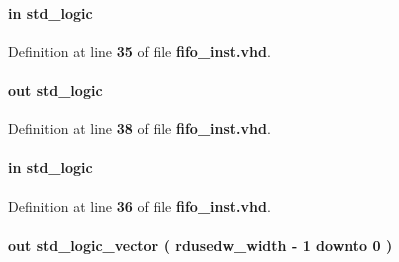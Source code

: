 \paragraph[{rdclk}]{ {\bfseries \textcolor{keywordflow}{in}\textcolor{vhdlchar}{ }} {\bfseries \textcolor{comment}{std\+\_\+logic}\textcolor{vhdlchar}{ }} \hspace{0.3cm}{\ttfamily [Port]}}\label{classfifo__inst_a75a474974665eb4350aea5fa937cb26a}


Definition at line {\bf 35} of file {\bf fifo\+\_\+inst.\+vhd}.

\paragraph[{rdempty}]{ {\bfseries \textcolor{keywordflow}{out}\textcolor{vhdlchar}{ }} {\bfseries \textcolor{comment}{std\+\_\+logic}\textcolor{vhdlchar}{ }} \hspace{0.3cm}{\ttfamily [Port]}}\label{classfifo__inst_a9de411b2245efc9c1d528023e62102de}


Definition at line {\bf 38} of file {\bf fifo\+\_\+inst.\+vhd}.

\paragraph[{rdreq}]{ {\bfseries \textcolor{keywordflow}{in}\textcolor{vhdlchar}{ }} {\bfseries \textcolor{comment}{std\+\_\+logic}\textcolor{vhdlchar}{ }} \hspace{0.3cm}{\ttfamily [Port]}}\label{classfifo__inst_a664672374cb02f8b68a5ff0a74918b73}


Definition at line {\bf 36} of file {\bf fifo\+\_\+inst.\+vhd}.

\paragraph[{rdusedw}]{ {\bfseries \textcolor{keywordflow}{out}\textcolor{vhdlchar}{ }} {\bfseries \textcolor{comment}{std\+\_\+logic\+\_\+vector}\textcolor{vhdlchar}{ }\textcolor{vhdlchar}{(}\textcolor{vhdlchar}{ }\textcolor{vhdlchar}{ }\textcolor{vhdlchar}{ }\textcolor{vhdlchar}{ }{\bfseries {\bf rdusedw\+\_\+width}} \textcolor{vhdlchar}{-\/}\textcolor{vhdlchar}{ } \textcolor{vhdldigit}{1} \textcolor{vhdlchar}{ }\textcolor{keywordflow}{downto}\textcolor{vhdlchar}{ }\textcolor{vhdlchar}{ } \textcolor{vhdldigit}{0} \textcolor{vhdlchar}{ }\textcolor{vhdlchar}{)}\textcolor{vhdlchar}{ }} \hspace{0.3cm}{\ttfamily [Port]}}\label{classfifo__inst_a9fa777737ec755dc9398e1cf8b843a57}


